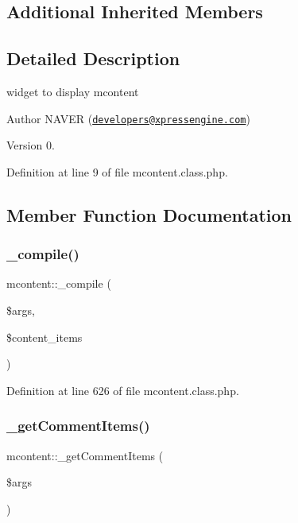 \subsection*{Additional Inherited Members}


\subsection{Detailed Description}
widget to display mcontent 

\begin{DoxyAuthor}{Author}
N\+A\+V\+ER (\href{mailto:developers@xpressengine.com}{\tt developers@xpressengine.\+com}) 
\end{DoxyAuthor}
\begin{DoxyVersion}{Version}
0. 
\end{DoxyVersion}


Definition at line 9 of file mcontent.\+class.\+php.



\subsection{Member Function Documentation}
\mbox{\label{classmcontent_ad31110bd1251e8de6256b26c279f32c9}} 
\subsubsection{\texorpdfstring{\+\_\+compile()}{\_compile()}}
{\footnotesize\ttfamily mcontent\+::\+\_\+compile (\begin{DoxyParamCaption}\item[{}]{\$args,  }\item[{}]{\$content\+\_\+items }\end{DoxyParamCaption})}



Definition at line 626 of file mcontent.\+class.\+php.

\mbox{\label{classmcontent_a6a077425294207e1e357668b82e30bbf}} 
\subsubsection{\texorpdfstring{\+\_\+get\+Comment\+Items()}{\_getCommentItems()}}
{\footnotesize\ttfamily mcontent\+::\+\_\+get\+Comment\+Items (\begin{DoxyParamCaption}\item[{}]{\$args }\end{DoxyParamCaption})}



